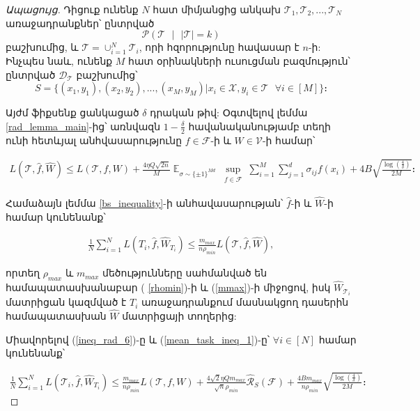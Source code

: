 \documentclass[12pt]{article}
\DeclareMathOperator*{\E}{\mathbb{E}}
\begin{document}
\begin{proof}[Ապացույց] 
Դիցուք ունենք $N$ հատ միմյանցից անկախ $\mathcal{T}_1,\mathcal{T}_2, ...,\mathcal{T}_N$  առաջադրանքներ՝ ընտրված 
$$\mathcal{P}(\mathcal{T} \text{ } |\text{ }  |\mathcal{T}| = k)$$
բաշխումից, և $\mathcal{T} = \cup_{i=1}^N\mathcal{T}_i$, որի հզորությունը հավասար է $n$-ի: Ինչպես նաև, ունենք $M$ հատ օրինակների ուսուցման բազմություն՝ ընտրված $\mathcal{D_\mathcal{T}}$ բաշխումից՝
$$S = \{(x_1, y_1), (x_2, y_2), ..., (x_M, y_M) | x_i \in \mathcal{X}, y_i \in \mathcal{T} \text{ }\forall i \in[M]\}։$$

 Այժմ ֆիքսենք ցանկացած $\delta$ դրական թիվ: Օգտվելով լեմմա \ref{rad_lemma_main}-ից՝ առնվազն $1-\frac{\delta}{2}$ հավանականությամբ տեղի ունի հետևյալ անհվասարությունը $f \in \mathcal{F}$-ի և $W \in \mathcal{V}$-ի համար՝

\begin{align}
\label{ineq_rad_6}
L(\mathcal{T}, \hat{f}, \hat{W}) \leq  L(\mathcal{T}, f, W) + \frac{4\eta Q\sqrt{2n}}{M} \E_{\sigma \sim \{\pm1\}^{Md}} \sup_{\substack{ f  \in \mathcal{F}  }}\sum_{i=1}^M \sum_{j=1}^d \sigma_{ij}f(x_i)+    4B\sqrt{\frac{\log \left( \frac{4}{\delta} \right)}{2M}}։
\end{align}

\noindent Համաձայն լեմմա \ref{bs_inequality}-ի անհավասարության՝  $\hat{f}$-ի և $\hat{W}$-ի համար կունենանք՝

\begin{align}
\label{mean_task_ineq_1}
\frac{1}{N}\sum_{i=1}^N L(T_i,\hat{f}, \hat{W}_{T_i}) \leq  \frac{m_{max}}{n \rho_{min}}  L(\mathcal{T},\hat{f}, \hat{W}) ,
\end{align}

\noindent որտեղ $\rho_{max}$ և $m_{max}$ մեծությունները սահմանված են համապատասխանաբար ( \ref{rhomin})-ի և (\ref{mmax})-ի միջոցով, իսկ $\hat{W}_{\mathcal{T}_i}$ մատրիցան կազմված է $T_i$ առաջադրանքում մասնակցող դասերին համապատասխան  $\hat{W}$ մատրիցայի տողերից:

Միավորելով (\ref{ineq_rad_6})-ը  և (\ref{mean_task_ineq_1})-ը՝ $\forall i \in [N]$ համար կունենանք՝



\begin{align}
\label{mean_task_ineq_2}
\frac{1}{N}\sum_{i=1}^N L(\mathcal{T}_i,\hat{f}, \hat{W}_{T_i}) \leq  \frac{m_{max}}{n \rho_{min}}  L(\mathcal{T}, f, W) +
\frac{4\sqrt{2} \eta Qm_{max}}{\sqrt{n}\rho_{min}} \hat{\mathcal{R}}_S(\mathcal{F})+    \frac{4Bm_{max}}{n\rho_{min}}\sqrt{\frac{\log \left( \frac{4}{\delta} \right)}{2M}}։
\end{align}


\end{proof}
\end{document}
